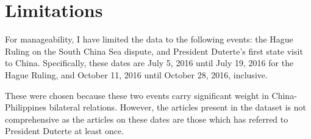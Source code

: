 \section{Limitations}\label{sec:limits}

For manageability, I have limited the data to the following events: the
Hague Ruling on the South China Sea dispute, and President Duterte's
first state visit to China. Specifically, these dates are July 5, 2016
until July 19, 2016 for the Hague Ruling, and October 11, 2016 until
October 28, 2016, inclusive.

These were chosen because these two events carry significant weight in
China-Philippines bilateral relations. However, the articles present in
the dataset is not comprehensive as the articles on these dates are
those which has referred to President Duterte at least once.

